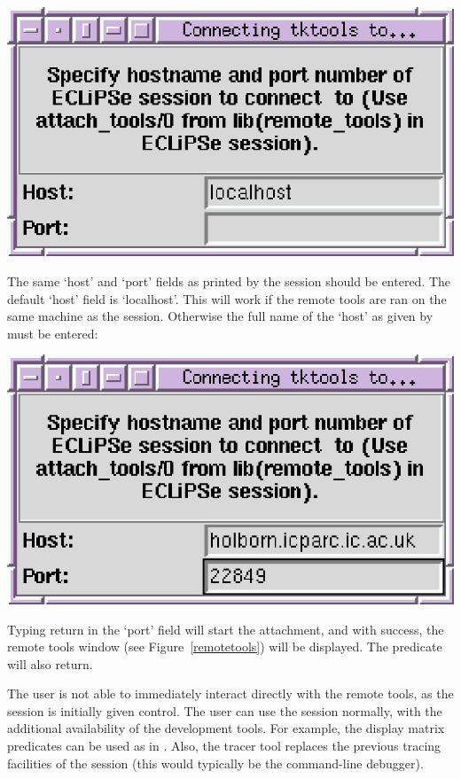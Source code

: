 \begin{center}
\includegraphics{remotecon.eps}
\end{center}

The same `host' and `port' fields as printed by the {\eclipse} session should
be entered. The default `host' field is `localhost'. This will work if the
remote tools are ran on the same machine as the {\eclipse}
session. Otherwise the full name of the `host' as given by
 must be entered:

\begin{center}
\includegraphics{remotecon2.eps}
\end{center}

Typing return in the `port' field will start the attachment, and with
success, the remote tools window (see Figure~\ref{remotetools}) will be
displayed. The  predicate will also return.

The user is not able to immediately interact directly with the remote
tools, as the {\eclipse} session is initially given control. The user can
use the {\eclipse} session normally, with the additional availability of
the development tools. For example, the display matrix predicates can be
used as in {\tkeclipse}. Also, the tracer tool replaces the previous
tracing facilities of the {\eclipse} session (this would typically be the
command-line debugger).

